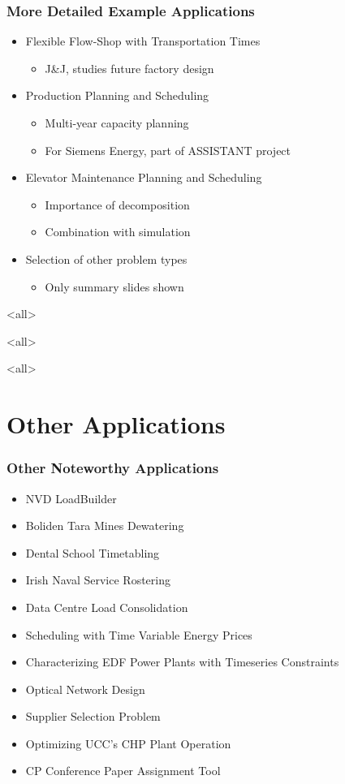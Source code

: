 \begin{frame}
\frametitle{More Detailed Example Applications}
\begin{itemize}
\item Flexible Flow-Shop with Transportation Times 
\begin{itemize}
\item J\&J, studies future factory design
\end{itemize}
\item Production Planning and Scheduling
\begin{itemize}
\item Multi-year capacity planning
\item For Siemens Energy, part of ASSISTANT project
\end{itemize}
\item Elevator Maintenance Planning and Scheduling
\begin{itemize}
\item Importance of decomposition
\item Combination with simulation
\end{itemize}
\item Selection of other problem types
\begin{itemize}
\item Only summary slides shown
\end{itemize}
\end{itemize}
\end{frame}


\mode<all>{}

\mode<all>{}

\mode<all>{}

\section{Other Applications}

\begin{frame}
\frametitle{Other Noteworthy Applications}
\begin{itemize}
\item NVD LoadBuilder
\item Boliden Tara Mines Dewatering
\item Dental School Timetabling
\item Irish Naval Service Rostering
\item Data Centre Load Consolidation
\item Scheduling with Time Variable Energy Prices
\item Characterizing EDF Power Plants with Timeseries Constraints
\item Optical Network Design
\item Supplier Selection Problem
\item Optimizing UCC's CHP Plant Operation
\item CP Conference Paper Assignment Tool
\end{itemize}
\end{frame}

